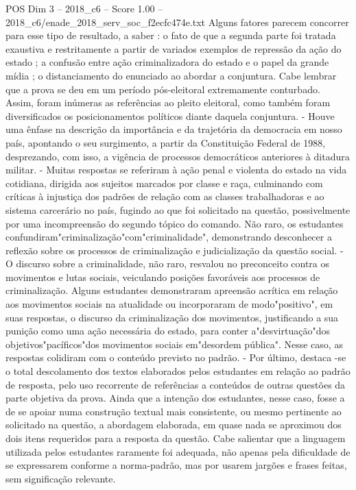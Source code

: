 \begin{textsample}{POS Dim 3 – 2018\_c6 – Score 1.00 – 2018\_c6/enade\_2018\_serv\_soc\_f2ecfc474e.txt}
Alguns fatores parecem concorrer para esse tipo de resultado, a saber : o fato de que a segunda parte foi tratada exaustiva e restritamente a partir de variados exemplos de repressão da ação do estado ; a confusão entre ação criminalizadora do estado e o papel da grande mídia ; o distanciamento do enunciado ao abordar a conjuntura.
Cabe lembrar que a prova se deu em um período pós-eleitoral extremamente conturbado.
Assim, foram inúmeras as referências ao pleito eleitoral, como também foram diversificados os posicionamentos políticos diante daquela conjuntura. - Houve uma ênfase na descrição da importância e da trajetória da democracia em nosso país, apontando o seu surgimento, a partir da Constituição Federal de 1988, desprezando, com isso, a vigência de processos democráticos anteriores à ditadura militar. - Muitas respostas se referiram à ação penal e violenta do estado na vida cotidiana, dirigida aos sujeitos marcados por classe e raça, culminando com críticas à injustiça dos padrões de relação com as classes trabalhadoras e ao sistema carcerário no país, fugindo ao que foi solicitado na questão, possivelmente por uma incompreensão do segundo tópico do comando.
Não raro, os estudantes confundiram"criminalização"com"criminalidade", demonstrando desconhecer a reflexão sobre os processos de criminalização e judicialização da questão social. - O discurso sobre a criminalidade, não raro, resvalou no preconceito contra os movimentos e lutas sociais, veiculando posições favoráveis aos processos de criminalização.
Alguns estudantes demonstraram apreensão acrítica em relação aos movimentos sociais na atualidade ou incorporaram de modo"positivo", em suas respostas, o discurso da criminalização dos movimentos, justificando a sua punição como uma ação necessária do estado, para conter a"desvirtuação"dos objetivos"pacíficos"dos movimentos sociais em"desordem pública".
Nesse caso, as respostas colidiram com o conteúdo previsto no padrão. - Por último, destaca -se o total descolamento dos textos elaborados pelos estudantes em relação ao padrão de resposta, pelo uso recorrente de referências a conteúdos de outras questões da parte objetiva da prova.
Ainda que a intenção dos estudantes, nesse caso, fosse a de se apoiar numa construção textual mais consistente, ou mesmo pertinente ao solicitado na questão, a abordagem elaborada, em quase nada se aproximou dos dois itens requeridos para a resposta da questão.
Cabe salientar que a linguagem utilizada pelos estudantes raramente foi adequada, não apenas pela dificuldade de se expressarem conforme a norma-padrão, mas por usarem jargões e frases feitas, sem significação relevante.

\end{textsample}
